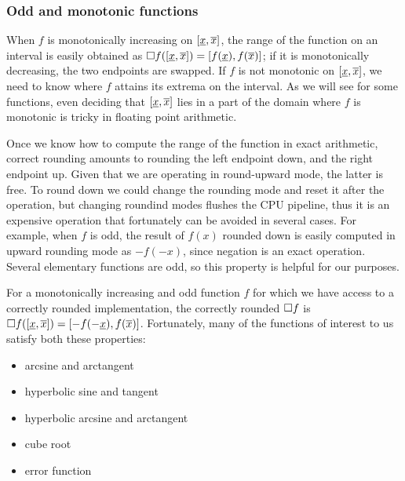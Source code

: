 \subsubsection{Odd and monotonic functions}
When $f$ is monotonically increasing on $[\underline{x}, \overline{x}]$, the range of the function on an interval is easily obtained as $\Box f([\underline{x}, \overline{x}]) = [f(\underline{x}), f(\overline{x})]$; if it is monotonically decreasing, the two endpoints are swapped.
If $f$ is not monotonic on $[\underline{x}, \overline{x}]$, we need to know where $f$ attains its extrema on the interval. As we will see for some functions, even deciding that $[\underline{x}, \overline{x}]$ lies in a part of the domain where $f$ is monotonic is tricky in floating point arithmetic.

Once we know how to compute the range of the function in exact arithmetic, correct rounding amounts to rounding the left endpoint down, and the right endpoint up. Given that we are operating in round-upward mode, the latter is free.
To round down we could change the rounding mode and reset it after the operation, but changing roundind modes flushes the CPU pipeline, thus it is an expensive operation that fortunately can be avoided in several cases.
For example, when $f$ is odd, the result of $f(x)$ rounded down is easily computed in upward rounding mode as $-f(-x)$, since negation is an exact operation. Several elementary functions are odd, so this property is helpful for our purposes.

For a monotonically increasing and odd function $f$ for which we have access to a correctly rounded implementation, the correctly rounded $\Box f$ is $\Box f([\underline{x}, \overline{x}]) = [-f(-\underline{x}), f(\overline{x})]$. Fortunately, many of the functions of interest to us satisfy both these properties:
\begin{itemize}
	\item arcsine and arctangent
	\item hyperbolic sine and tangent
	\item hyperbolic arcsine and arctangent
	\item cube root
	\item error function
\end{itemize}

